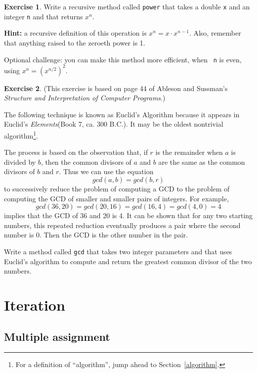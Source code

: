 \documentclass[12pt]{book}
\def\HINT{\textbf{Hint:}}
\theoremstyle{definition}
\newtheorem{excz}{Exercise}[chapter]
\newenvironment{exercise}{\bigskip\begin{excz}\mbox{}}{\end{excz}}
\begin{document}
\begin{exercise}
\label{ex.power}
Write a recursive method called {\tt power} that
takes a double {\tt x} and an integer {\tt n} and that
returns $x^n$.

\HINT{} a recursive definition of this
operation is $x^n = x \cdot x^{n-1}$.
Also, remember that anything raised to the zeroeth power
is 1.

Optional challenge: you can make this method more efficient, when {\tt
  n} is even, using $x^n = \left( x^{n/2} \right)^2$.

\end{exercise}


\begin{exercise}
\label{gcd}
(This exercise is based on page 44 of Ableson and Sussman's
{\em Structure and Interpretation of Computer Programs}.)

The following technique is known as Euclid's Algorithm because
it appears in Euclid's {\em Elements}(Book 7, ca. 300 B.C.).
It may be the oldest nontrivial algorithm\footnote{For a definition
of ``algorithm'', jump ahead to Section~\ref{algorithm}.}.

The process is based on the observation that, if $r$ is the
remainder when $a$ is divided by $b$, then the common divisors
of $a$ and $b$ are the same as the common divisors of $b$ and $r$.
Thus we can use the equation
%
\[ gcd(a, b) = gcd(b, r) \]
%
to successively reduce the problem of computing a GCD to the
problem of computing the GCD of smaller and smaller pairs of integers.
For example,
%
\[ gcd(36, 20) = gcd(20, 16) = gcd(16, 4) = gcd(4, 0) = 4\]
%
implies that the GCD of 36 and 20 is 4.  It can be shown
that for any two starting numbers, this repeated reduction eventually
produces a pair where the second number is 0.  Then the GCD is the
other number in the pair.

Write a method called {\tt gcd} that takes two integer parameters and
that uses Euclid's algorithm to compute and return the greatest
common divisor of the two numbers.
\end{exercise}


\chapter{Iteration}
\label{chap06}

\section{Multiple assignment}
\end{document}
